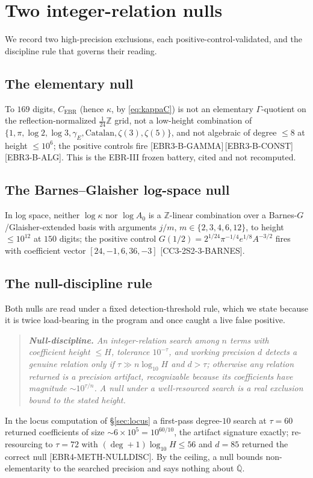 \documentclass[11pt,reqno]{amsart}
\theoremstyle{plain}
\theoremstyle{definition}
\theoremstyle{remark}
\newcommand{\Q}{\mathbb{Q}}
\newcommand{\Z}{\mathbb{Z}}
\newcommand{\Qbar}{\overline{\Q}}
\newcommand{\Cebr}{C_{\mathrm{EBR}}}
\newcommand{\claim}[1]{\textsf{\small[#1]}}
\begin{document}
\section{Two integer-relation nulls}\label{sec:nulls}

We record two high-precision exclusions, each positive-control-validated, and
the discipline rule that governs their reading.

\subsection{The elementary null}\label{sec:nullelem}
To $169$ digits, $\Cebr$ (hence $\kappa$, by \eqref{eq:kappaC}) is not an
elementary $\Gamma$-quotient on the reflection-normalized $\tfrac{1}{24}\Z$
grid, not a low-height combination of
$\{1,\pi,\log2,\log3,\gamma_{E},\text{Catalan},\zeta(3),\zeta(5)\}$, and not
algebraic of degree $\le8$ at height $\le10^{6}$; the positive controls fire
\cite{EBRIII} \claim{EBR3-B-GAMMA}\,\claim{EBR3-B-CONST}\,\claim{EBR3-B-ALG}.
This is the EBR-III frozen battery, cited and not recomputed.

\subsection{The Barnes--Glaisher log-space null}\label{sec:nullbarnes}
In log space, neither $\log\kappa$ nor $\log A_{0}$ is a $\Z$-linear
combination over a Barnes-$G$/Glaisher-extended basis with arguments
$j/m$, $m\in\{2,3,4,6,12\}$, to height $\le10^{12}$ at $150$ digits; the
positive control $G(1/2)=2^{1/24}\pi^{-1/4}e^{1/8}A^{-3/2}$ fires with
coefficient vector $[24,-1,6,36,-3]$ \claim{CC3-2S2-3-BARNES}.

\subsection{The null-discipline rule}\label{sec:nulldisc}
Both nulls are read under a fixed detection-threshold rule, which we state
because it is twice load-bearing in the program and once caught a live false
positive.
\begin{quote}\small\itshape
\textbf{Null-discipline.} An integer-relation search among $n$ terms with
coefficient height $\le H$, tolerance $10^{-\tau}$, and working precision $d$
detects a genuine relation only if $\tau\gg n\log_{10}H$ and $d>\tau$;
otherwise any relation returned is a precision artifact, recognizable because
its coefficients have magnitude $\sim10^{\tau/n}$. A null under a
well-resourced search is a real exclusion bound to the stated height.
\end{quote}
In the locus computation of \S\ref{sec:locus} a first-pass degree-$10$ search at
$\tau=60$ returned coefficients of size $\sim\!6\times10^{5}=10^{60/10}$, the
artifact signature exactly; re-resourcing to $\tau=72$ with
$(\deg+1)\log_{10}H\le56$ and $d=85$ returned the correct null
\claim{EBR4-METH-NULLDISC}. By the ceiling, a null bounds non-elementarity to
the searched precision and says nothing about $\Qbar$.
\end{document}
